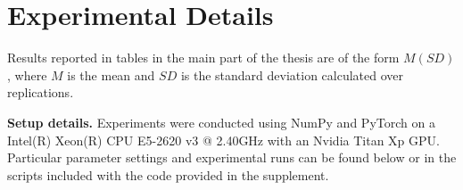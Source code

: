 \section{Experimental Details}
 Results reported in tables in the main part of the thesis are of the form $M\scriptscriptstyle{(SD)}$, where $M$ is the mean and $SD$ is the standard deviation calculated over replications.

{\bf Setup details.} Experiments were conducted using NumPy and PyTorch on a Intel(R) Xeon(R) CPU E5-2620 v3 @ 2.40GHz with an Nvidia Titan Xp GPU. Particular parameter settings and experimental runs can be found below or in the scripts included with the code provided in the supplement.

